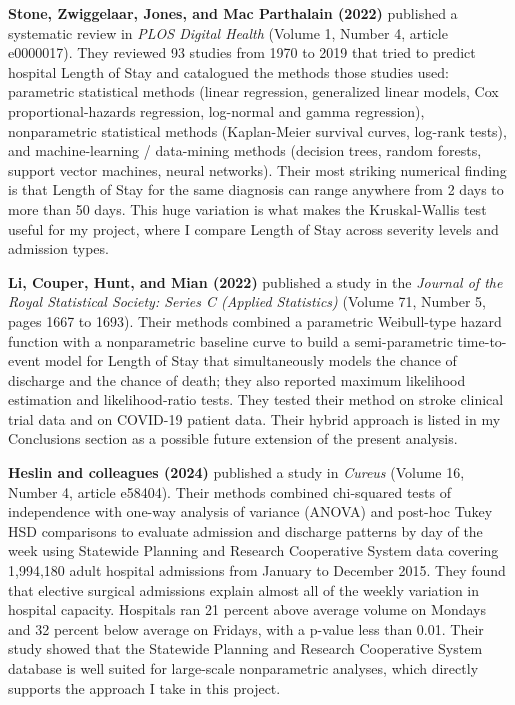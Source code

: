 \documentclass[12pt]{article}
\begin{document}
\textbf{Stone, Zwiggelaar, Jones, and Mac Parthalain (2022)} published
a systematic review in \textit{PLOS Digital Health} (Volume 1, Number
4, article e0000017). They reviewed 93 studies from 1970 to 2019 that
tried to predict hospital Length of Stay and catalogued the methods
those studies used: parametric statistical methods (linear regression,
generalized linear models, Cox proportional-hazards regression, log-normal
and gamma regression), nonparametric statistical methods (Kaplan-Meier
survival curves, log-rank tests), and machine-learning / data-mining
methods (decision trees, random forests, support vector machines,
neural networks). Their most striking numerical finding is that
Length of Stay for the same diagnosis can range anywhere from 2 days
to more than 50 days. This huge variation is what makes the
Kruskal-Wallis test useful for my project, where I compare Length of
Stay across severity levels and admission types.

\textbf{Li, Couper, Hunt, and Mian (2022)} published a study in the
\textit{Journal of the Royal Statistical Society: Series C (Applied
Statistics)} (Volume 71, Number 5, pages 1667 to 1693). Their methods
combined a parametric Weibull-type hazard function with a
nonparametric baseline curve to build a semi-parametric time-to-event
model for Length of Stay that simultaneously models the chance of
discharge and the chance of death; they also reported maximum
likelihood estimation and likelihood-ratio tests. They tested their
method on stroke clinical trial data and on COVID-19 patient data.
Their hybrid approach is listed in my Conclusions section as a
possible future extension of the present analysis.

\textbf{Heslin and colleagues (2024)} published a study in
\textit{Cureus} (Volume 16, Number 4, article e58404). Their methods
combined chi-squared tests of independence with one-way analysis of
variance (ANOVA) and post-hoc Tukey HSD comparisons to evaluate
admission and discharge patterns by day of the week using Statewide
Planning and Research Cooperative System data covering 1,994,180
adult hospital admissions from January to December 2015. They found
that elective surgical admissions explain almost all of the weekly
variation in hospital capacity. Hospitals ran 21 percent above
average volume on Mondays and 32 percent below average on Fridays,
with a p-value less than 0.01. Their study showed that the Statewide
Planning and Research Cooperative System database is well suited for
large-scale nonparametric analyses, which directly supports the
approach I take in this project.
\end{document}
